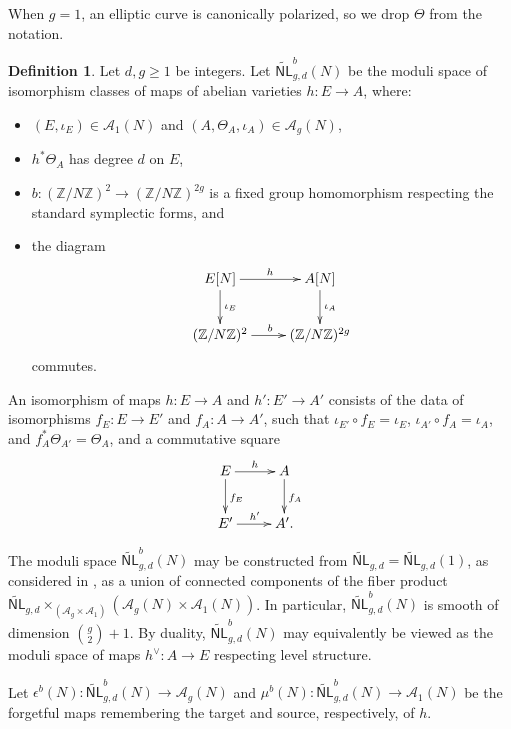\documentclass[12pt]{amsart}
\def\cA{\mathcal{A}}
\def\cM{\mathcal{M}}
\def\bZ{\mathbb{Z}}
\DeclareMathOperator{\ct}{ct}
\newcommand{\wNL}{{\widetilde{\mathsf{NL}}}}
\newcommand{\Tor}{{\mathsf{Tor}}}
\theoremstyle{definition}
\newtheorem{defn}[thm]{Definition}
\newcommand{\CL}[1]{{\color{blue}CL: #1}}
\begin{document}
When $g=1$, an elliptic curve is canonically polarized, so we drop $\Theta$ from the notation.


\begin{defn}
    Let $d,g\ge1$ be integers. Let $\wNL^b_{g,d}(N)$ be the moduli space of isomorphism classes of maps of abelian varieties $h:E\to A$, where:
    \begin{itemize}
        \item $(E,\iota_E)\in \cA_{1}(N)$ and $(A,\Theta_A,\iota_A)\in \cA_{g}(N)$,
        \item $h^{*}\Theta_A$ has degree $d$ on $E$, 
        \item $b:(\bZ/N\bZ)^{2} \to (\bZ/N\bZ)^{2g}$ is a fixed group homomorphism respecting the standard symplectic forms, and
        \item the diagram
        \begin{equation*}
        \xymatrix{
        E[N] \ar[r]^{h} \ar[d]^{\iota_E} & A[N] \ar[d]^{\iota_A}\\
        (\bZ/N\bZ)^{2} \ar[r]^b & (\bZ/N\bZ)^{2g}
        }
        \end{equation*}
        commutes.
    \end{itemize}
    An isomorphism of maps $h:E\to A$ and $h':E'\to A'$ consists of the data of isomorphisms $f_E:E\to E'$ and $f_A:A\to A'$, such that $\iota_{E'}\circ f_E=\iota_E$, $\iota_{A'}\circ f_A =\iota_A$, and $f_A^{*}\Theta_{A'}=\Theta_A$, and a commutative square
        \begin{equation*}
        \xymatrix{
        E \ar[r]^h \ar[d]^{f_E} & A \ar[d]^{f_A} \\
        E' \ar[r]^{h'} & A'.
        }
        \end{equation*}
    

The moduli space $\wNL^b_{g,d}(N)$ may be constructed from $\wNL_{g,d}=\wNL_{g,d}(1)$, as considered in \cite{gl}, as a union of connected components of the fiber product $\wNL_{g,d}\times_{(\cA_g\times\cA_1)} (\cA_g(N)\times\cA_1(N))$. In particular, $\wNL^b_{g,d}(N)$ is smooth of dimension $\binom{g}{2}+1$. By duality, $\wNL^b_{g,d}(N)$ may equivalently be viewed as the moduli space of maps $h^\vee:A\to E$ respecting level structure.

Let $\epsilon^b(N):\wNL^b_{g,d}(N)\to \cA_g(N)$ and $\mu^b(N):\wNL^b_{g,d}(N)\to \cA_1(N)$ be the forgetful maps remembering the target and source, respectively, of $h$.
\end{defn}
\end{document}
